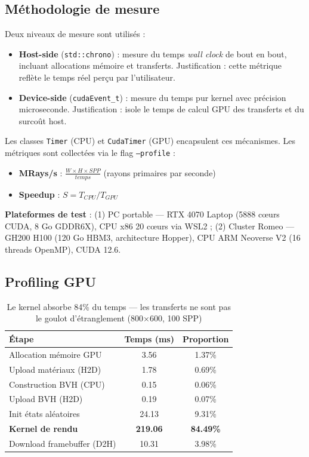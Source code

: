 \documentclass[12pt,a4paper]{article}
\begin{document}
\subsection{M\'{e}thodologie de mesure}

Deux niveaux de mesure sont utilis\'{e}s :
\begin{itemize}
    \item \textbf{Host-side} (\texttt{std::chrono}) : mesure du temps \textit{wall clock} de bout en bout, incluant allocations m\'{e}moire et transferts. Justification : cette m\'{e}trique refl\`{e}te le temps r\'{e}el per\c{c}u par l'utilisateur.
    \item \textbf{Device-side} (\texttt{cudaEvent\_t}) : mesure du temps pur kernel avec pr\'{e}cision microseconde. Justification : isole le temps de calcul GPU des transferts et du surco\^{u}t host.
\end{itemize}

Les classes \texttt{Timer} (CPU) et \texttt{CudaTimer} (GPU) encapsulent ces m\'{e}canismes. Les m\'{e}triques sont collect\'{e}es via le flag \texttt{--profile} :
\begin{itemize}
    \item \textbf{MRays/s} : $\frac{W \times H \times SPP}{temps}$ (rayons primaires par seconde)
    \item \textbf{Speedup} : $S = T_{CPU} / T_{GPU}$
\end{itemize}

\textbf{Plateformes de test} : (1) PC portable --- RTX 4070 Laptop (5888 c\oe urs CUDA, 8 Go GDDR6X), CPU x86 20 c\oe urs via WSL2 ; (2) Cluster Romeo --- GH200 H100 (120 Go HBM3, architecture Hopper), CPU ARM Neoverse V2 (16 threads OpenMP), CUDA 12.6.

\subsection{Profiling GPU}

\begin{table}[H]
\centering
\caption{Le kernel absorbe 84\% du temps --- les transferts ne sont pas le goulot d'\'{e}tranglement (800$\times$600, 100 SPP)}
\begin{tabular}{lcc}
\toprule
\textbf{\'{E}tape} & \textbf{Temps (ms)} & \textbf{Proportion} \\
\midrule
Allocation m\'{e}moire GPU & 3.56 & 1.37\% \\
Upload mat\'{e}riaux (H2D) & 1.78 & 0.69\% \\
Construction BVH (CPU) & 0.15 & 0.06\% \\
Upload BVH (H2D) & 0.19 & 0.07\% \\
Init \'{e}tats al\'{e}atoires & 24.13 & 9.31\% \\
\textbf{Kernel de rendu} & \textbf{219.06} & \textbf{84.49\%} \\
Download framebuffer (D2H) & 10.31 & 3.98\% \\
\bottomrule
\end{tabular}
\label{tab:profiling}
\end{table}
\end{document}
